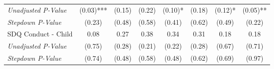 \begin{tabular}{l c c c c c c c}
\quad \textit{Unadjusted P-Value} & (0.03)*** & (0.15) & (0.22) & (0.10)* & (0.18) & (0.12)* & (0.05)** \\
\quad \textit{Stepdown P-Value} & (0.23) & (0.48) & (0.58) & (0.41) & (0.62) & (0.49) & (0.22) \\
SDQ Conduct - Child & 0.08 & 0.27 & 0.38 & 0.34 & 0.31 & 0.18 & 0.18 \\
\quad \textit{Unadjusted P-Value} & (0.75) & (0.28) & (0.21) & (0.22) & (0.28) & (0.67) & (0.71) \\
\quad \textit{Stepdown P-Value} & (0.74) & (0.48) & (0.58) & (0.48) & (0.62) & (0.69) & (0.97) \\
\bottomrule
\end{tabular}
